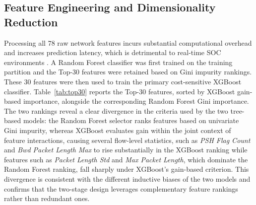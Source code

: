 \documentclass[conference]{IEEEtran}
\begin{document}
\subsection{Feature Engineering and Dimensionality Reduction}
Processing all 78 raw network features incurs substantial computational overhead and increases prediction latency, which is detrimental to real-time SOC environments \cite{c18,c19}. A Random Forest classifier was first trained on the training partition and the Top-30 features were retained based on Gini impurity rankings. These 30 features were then used to train the primary cost-sensitive XGBoost classifier. 
Table~\ref{tab:top30} reports the Top-30 features, sorted by XGBoost 
gain-based importance, alongside the corresponding Random Forest Gini importance. The two rankings reveal a clear divergence in the criteria 
used by the two tree-based models: the Random Forest selector ranks 
features based on univariate Gini impurity, whereas XGBoost evaluates 
gain within the joint context of feature interactions, causing several 
flow-level statistics, such as \textit{PSH Flag Count} and 
\textit{Bwd Packet Length Max} to rise substantially in the XGBoost 
ranking while features such as \textit{Packet Length Std} and 
\textit{Max Packet Length}, which dominate the Random Forest ranking, 
fall sharply under XGBoost's gain-based criterion. This divergence is 
consistent with the different inductive biases of the two models and 
confirms that the two-stage design leverages complementary feature 
rankings rather than redundant ones.
\end{document}
